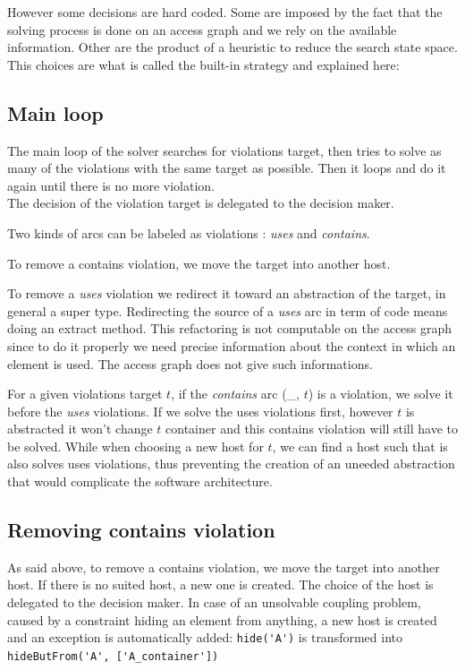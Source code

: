 \documentclass[]{article}
\newcommand{\textarc}[1]{\textit{#1}}
\newcommand{\textuses}{\textarc{uses}}
\newcommand{\textcontains}{\textarc{contains}}
\begin{document}
However some decisions are hard coded. Some are imposed by the fact that the solving process is done on an access graph and we rely on the available information.
Other are the product of a heuristic to reduce the search state space. This choices are what is called the built-in strategy and explained here:

\subsection{Main loop}
The main loop of the solver searches for violations target, then tries to solve as many of the violations with the same target as possible. Then it loops and do it again until there is no more violation.\\

The decision of the violation target is delegated to the decision maker.

Two kinds of arcs can be labeled as violations : \textuses{} and \textcontains.

To remove a contains violation, we move the target into another host.

To remove a \textuses{} violation we redirect it toward an abstraction of the target, in general a super type. Redirecting the source of a \textuses{} arc in term of code means doing an extract method. This refactoring is not computable on the access graph since to do it properly we need precise information about the context in which an element is used. The access graph does not give such informations.

For a given violations target $t$, if the \textcontains{} arc (\_, $t$) is a violation, we solve it before the \textuses{} violations.
If we solve the uses violations first, however $t$ is abstracted it won't change $t$ container and this contains violation will still have to be solved.
While when choosing a new host for $t$, we can find a host such that is also solves uses violations, thus preventing the creation of an uneeded abstraction that would complicate the software architecture.

\subsection{Removing contains violation}
As said above, to remove a contains violation, we move the target into another host. If there is no suited host, a new one is created.
The choice of the host is delegated to the decision maker.
In case of an unsolvable coupling problem, caused by a constraint hiding an element from anything, a new host is created and an exception is automatically added:
\verb|hide('A')| is transformed into \verb|hideButFrom('A', ['A_container'])|
\end{document}
